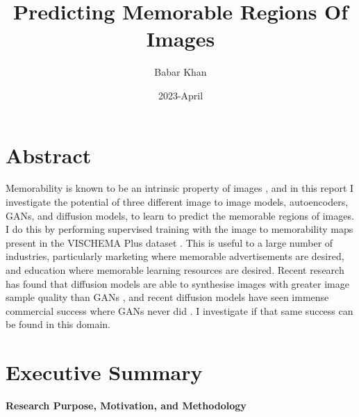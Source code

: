 \documentclass{UoYCSproject}
\author{Babar Khan}
\title{Predicting Memorable Regions Of Images}
\date{2023-April}
\begin{document}
\maketitle

\chapter{Abstract}
Memorability is known to be an intrinsic property of images \cite{Isola2011,IsolaParikhTorralbaOliva2011}, and in this report I investigate the potential of three different image to image models, autoencoders, GANs, and diffusion models, to learn to predict the memorable regions of images. I do this by performing supervised training with the image to memorability maps present in the VISCHEMA Plus dataset \cite{VischemaPaper}. This is useful to a large number of industries, particularly marketing where memorable advertisements are desired, and education where memorable learning resources are desired. Recent research has found that diffusion models are able to synthesise images with greater image sample quality than GANs \cite{dhariwal2021diffusion}, and recent diffusion models have seen immense commercial success where GANs never did \cite{ramesh2022hierarchical, saharia2022photorealistic}. I investigate if that same success can be found in this domain.
 
\chapter{Executive Summary}




\textbf{Research Purpose, Motivation, and Methodology}
\end{document}
